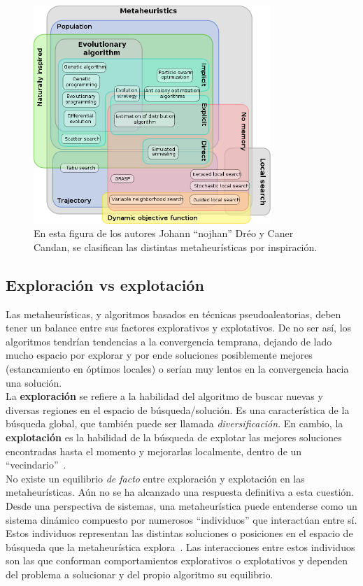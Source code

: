 \begin{figure}[H]
    \begin{center}
        \includegraphics[width=0.8\textwidth]{imagenes/mh_euler_graph.png}
    \end{center}
    \caption[Clasificación metaheurísticas]{En esta figura de los autores Johann ``nojhan'' Dréo y Caner Candan, se clasifican las distintas metaheurísticas por inspiración.}
\end{figure}

\subsection{Exploración vs explotación}
Las metaheurísticas, y algoritmos basados en técnicas pseudoaleatorias, deben tener un balance entre sus factores explorativos y explotativos. De no ser así, los algoritmos tendrían tendencias a la convergencia temprana, dejando de lado mucho espacio por explorar y por ende soluciones posiblemente mejores (estancamiento en óptimos locales) o serían muy lentos en la convergencia hacia una solución.\\[6pt]
La \textbf{exploración} se refiere a la habilidad del algoritmo de buscar nuevas y diversas regiones en el espacio de búsqueda/solución. Es una característica de la búsqueda global, que también puede ser llamada \textit{diversificación}. En cambio, la \textbf{explotación} es la habilidad de la búsqueda de explotar las mejores soluciones encontradas hasta el momento y mejorarlas localmente, dentro de un ``vecindario''~\cite{xu2014exploration}.\\[6pt]
No existe un equilibrio \textit{de facto} entre exploración y explotación en las metaheurísticas. Aún no se ha alcanzado una respuesta definitiva a esta cuestión. Desde una perspectiva de sistemas, una metaheurística puede entenderse como un sistema dinámico compuesto por numerosos ``individuos'' que interactúan entre sí. Estos individuos representan las distintas soluciones o posiciones en el espacio de búsqueda que la metaheurística explora~\cite{6896450}. Las interacciones entre estos individuos son las que conforman comportamientos explorativos o explotativos y dependen del problema a solucionar y del propio algoritmo su equilibrio.

